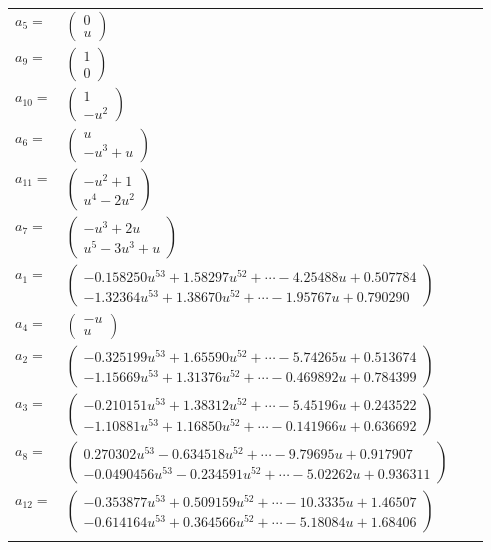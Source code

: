 \documentclass[1p]{elsarticle_modified}
\theoremstyle{definition}
\begin{document}
\begin{tabular}{m{7pt} m{180pt} m{7pt} m{180pt} }
\flushright $a_{5}=$&$\begin{pmatrix}0\\u\end{pmatrix}$ \\
\flushright $a_{9}=$&$\begin{pmatrix}1\\0\end{pmatrix}$ \\
\flushright $a_{10}=$&$\begin{pmatrix}1\\- u^2\end{pmatrix}$ \\
\flushright $a_{6}=$&$\begin{pmatrix}u\\- u^3+u\end{pmatrix}$ \\
\flushright $a_{11}=$&$\begin{pmatrix}- u^2+1\\u^4-2 u^2\end{pmatrix}$ \\
\flushright $a_{7}=$&$\begin{pmatrix}- u^3+2 u\\u^5-3 u^3+u\end{pmatrix}$ \\
\flushright $a_{1}=$&$\begin{pmatrix}-0.158250 u^{53}+1.58297 u^{52}+\cdots-4.25488 u+0.507784\\-1.32364 u^{53}+1.38670 u^{52}+\cdots-1.95767 u+0.790290\end{pmatrix}$ \\
\flushright $a_{4}=$&$\begin{pmatrix}- u\\u\end{pmatrix}$ \\
\flushright $a_{2}=$&$\begin{pmatrix}-0.325199 u^{53}+1.65590 u^{52}+\cdots-5.74265 u+0.513674\\-1.15669 u^{53}+1.31376 u^{52}+\cdots-0.469892 u+0.784399\end{pmatrix}$ \\
\flushright $a_{3}=$&$\begin{pmatrix}-0.210151 u^{53}+1.38312 u^{52}+\cdots-5.45196 u+0.243522\\-1.10881 u^{53}+1.16850 u^{52}+\cdots-0.141966 u+0.636692\end{pmatrix}$ \\
\flushright $a_{8}=$&$\begin{pmatrix}0.270302 u^{53}-0.634518 u^{52}+\cdots-9.79695 u+0.917907\\-0.0490456 u^{53}-0.234591 u^{52}+\cdots-5.02262 u+0.936311\end{pmatrix}$ \\
\flushright $a_{12}=$&$\begin{pmatrix}-0.353877 u^{53}+0.509159 u^{52}+\cdots-10.3335 u+1.46507\\-0.614164 u^{53}+0.364566 u^{52}+\cdots-5.18084 u+1.68406\end{pmatrix}$\\&\end{tabular}
\end{document}

